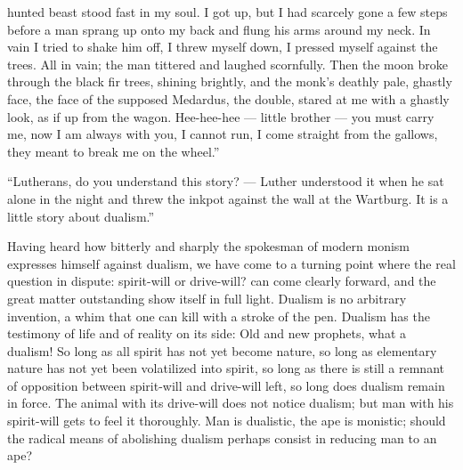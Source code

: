 \documentclass[12pt,a4paper,openany]{book}
\newcommand{\opage}[1]{\marginnote{\footnotesize\textit{[#1]}}}
\begin{document}
hunted beast stood fast in my soul. I got up, but
I had scarcely gone a few steps before a man
\setcounter{footnote}{0}%
\opage{103}sprang up onto my back and flung his arms around
my neck. In vain I tried to shake him off, I
threw myself down, I pressed myself against the trees.
All in vain; the man tittered and laughed scornfully. Then
the moon broke through the black fir trees, shining brightly,
and the monk's deathly pale, ghastly face, the face of the
supposed Medardus, the double, stared
at me with a ghastly look, as if up from
the wagon. Hee-hee-hee --- little brother --- you must carry me,
now I am always with you, I cannot run, I come
straight from the gallows, they meant to break me on the wheel.''

``Lutherans, do you understand this story? --- Luther
understood it when he sat alone in the night and threw the inkpot
against the wall at the Wartburg. It is a little
story about dualism.''

Having heard how bitterly and sharply the
spokesman of modern monism expresses himself against dualism,
we have come to a turning point where the real
question in dispute: spirit-will or drive-will? can
come clearly forward, and the great matter outstanding show
itself in full light. Dualism is no arbitrary
invention, a whim that one can kill with a
stroke of the pen. Dualism has the testimony of life and of reality
on its side: Old and new prophets, what a
dualism! So long as all spirit has not yet become
nature, so long as elementary nature has not yet
been volatilized into spirit, so long as there is still a
remnant of opposition between spirit-will and drive-will
left, so long does dualism remain in force. The animal
with its drive-will does not notice dualism; but
man with his spirit-will gets to feel it
\setcounter{footnote}{0}%
\opage{104}thoroughly. Man is dualistic, the ape is monistic;
should the radical means of abolishing dualism
perhaps consist in reducing man to an ape?
\end{document}
